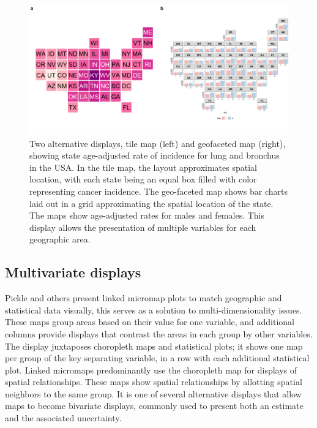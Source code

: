 \documentclass{monashthesis}
\begin{document}
\begin{figure}
\includegraphics[width=1\linewidth]{figures/02-literature/gggrids} \caption{ Two alternative displays, tile map (left) and geofaceted map (right), showing state age-adjusted rate of incidence for lung and bronchus in the USA. In the tile map, the layout approximates spatial location, with each state being an equal box filled with color representing cancer incidence. The geo-faceted map shows bar charts laid out in a grid approximating the spatial location of the state. The maps show age-adjusted rates for males and females. This display allows the presentation of multiple variables for each geographic area.}\label{fig:ggtilemap}
\end{figure}

\hypertarget{multivariate-displays}{%
\subsection{Multivariate displays}\label{multivariate-displays}}

Pickle and others \autocite{MMST} present linked micromap plots to match geographic and statistical data visually, this serves as a solution to multi-dimensionality issues. These maps group areas based on their value for one variable, and additional columns provide displays that contrast the areas in each group by other variables. The display juxtaposes choropleth maps and statistical plots; it shows one map per group of the key separating variable, in a row with each additional statistical plot. Linked micromaps predominantly use the choropleth map for displays of spatial relationships. These maps show spatial relationships by allotting spatial neighbors to the same group. It is one of several alternative displays that allow maps to become bivariate displays, commonly used to present both an estimate and the associated uncertainty.
\end{document}

